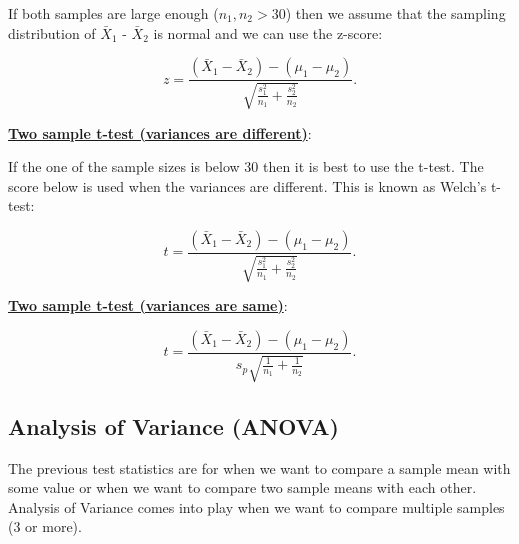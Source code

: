 \noindent If both samples are large enough ($n_1, n_2 > 30$) then we assume that the sampling distribution of $\bar{X}_1$ - $\bar{X}_2$ is normal and we can use the z-score:

\begin{equation}
z = \frac{(\bar{X}_1 -   \bar{X}_2) - (\mu_1 - \mu_2)}{\sqrt{\frac{s_1^2}{n_1} + \frac{s_2^2}{n_2}}}.
\end{equation}

\noindent \underline{\textbf{Two sample t-test (variances are different)}}:

If the one of the sample sizes is below 30 then it is best to use the t-test. The score below is used when the variances are different. This is known as Welch's t-test:

\begin{equation}
t = \frac{(\bar{X}_1 -   \bar{X}_2) - (\mu_1 - \mu_2)}{\sqrt{\frac{s_1^2}{n_1} + \frac{s_2^2}{n_2}}}.
\end{equation}

\noindent \underline{\textbf{Two sample t-test (variances are same)}}:

\begin{equation}
t = \frac{(\bar{X}_1 -   \bar{X}_2) - (\mu_1 - \mu_2)}{s_p\sqrt{\frac{1}{n_1} + \frac{1}{n_2}}}.
\end{equation}


\subsection{Analysis of Variance (ANOVA)}

The previous test statistics are for when we want to compare a sample mean with some value or when we want to compare two sample means with each other. Analysis of Variance comes into play when we want to compare multiple samples (3 or more). 













